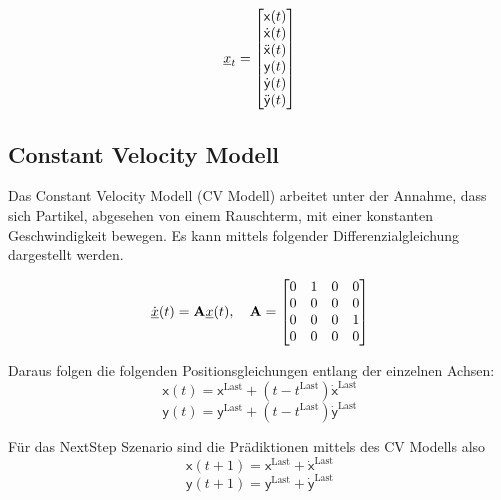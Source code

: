 \begin{equation} \label{eq:definitionCA}
    {\underline{x}}_t = 
    \begin{bmatrix}
        \mathsf{x}(t) \\
        \dot{\mathsf{x}}(t) \\
        \ddot{\mathsf{x}}(t) \\
        \mathsf{y}(t) \\
        \dot{\mathsf{y}}(t) \\
        \ddot{\mathsf{y}}(t)
       \end{bmatrix} 
\end{equation}

\subsection{Constant Velocity Modell}

Das Constant Velocity Modell (CV Modell) arbeitet unter der Annahme, dass sich Partikel, 
abgesehen von einem Rauschterm, mit einer konstanten Geschwindigkeit bewegen.
Es kann mittels folgender Differenzialgleichung dargestellt werden.

\begin{equation*} \label{eq:speedCV}
    \dot{{\underline{x}}}(t) = {{\mathbf{A}}}{\underline{x}}(t), \quad {\ensuremath{{\mathbf{A}}}} = 
    \begin{bmatrix}
        0 & 1 & 0 & 0 \\
        0 & 0 & 0 & 0 \\
        0 & 0 & 0 & 1\\
        0 & 0 & 0 & 0
    \end{bmatrix} 
\end{equation*}

Daraus folgen die folgenden Positionsgleichungen entlang der einzelnen Achsen:
\begin{equation*}
    \mathsf{x}(t) = \mathsf{x}^{\text{Last}} + (t - t^{\text{Last}})\dot{\mathsf{x}}^{\text{Last}}
\end{equation*}
\begin{equation*}
    \mathsf{y}(t) = \mathsf{y}^{\text{Last}} + (t - t^{\text{Last}})\dot{\mathsf{y}}^{\text{Last}}
\end{equation*}

Für das NextStep Szenario sind die Prädiktionen mittels des CV Modells also
\begin{equation*}
    \mathsf{x}(t+1) = \mathsf{x}^{\text{Last}} + \dot{\mathsf{x}}^{\text{Last}}
\end{equation*}
\begin{equation}\label{eq:cvyp}
    \mathsf{y}(t+1) = \mathsf{y}^{\text{Last}} + \dot{\mathsf{y}}^{\text{Last}}
\end{equation}


